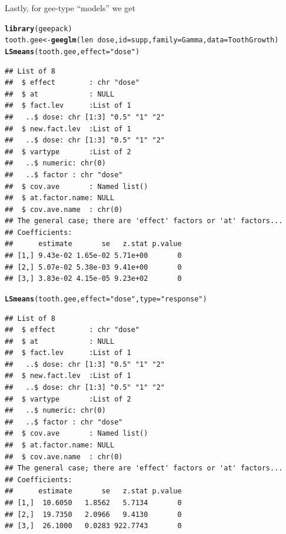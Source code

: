 \documentclass[10pt]{article}\usepackage[]{graphicx}\usepackage[]{color}
\makeatletter
\newcommand{\hlstr}[1]{\textcolor[rgb]{0.192,0.494,0.8}{#1}}%
\newcommand{\hlopt}[1]{\textcolor[rgb]{0,0,0}{#1}}%
\newcommand{\hlstd}[1]{\textcolor[rgb]{0.345,0.345,0.345}{#1}}%
\newcommand{\hlkwb}[1]{\textcolor[rgb]{0.69,0.353,0.396}{#1}}%
\newcommand{\hlkwc}[1]{\textcolor[rgb]{0.333,0.667,0.333}{#1}}%
\newcommand{\hlkwd}[1]{\textcolor[rgb]{0.737,0.353,0.396}{\textbf{#1}}}%
\newenvironment{kframe}{%
 \def\at@end@of@kframe{}%
 \ifinner\ifhmode%
  \def\at@end@of@kframe{\end{minipage}}%
  \begin{minipage}{\columnwidth}%
 \fi\fi%
 \def\FrameCommand##1{\hskip\@totalleftmargin \hskip-\fboxsep
 \colorbox{shadecolor}{##1}\hskip-\fboxsep
     \hskip-\linewidth \hskip-\@totalleftmargin \hskip\columnwidth}%
 \MakeFramed {\advance\hsize-\width
   \@totalleftmargin\z@ \linewidth\hsize
   \@setminipage}}%
 {\par\unskip\endMakeFramed%
 \at@end@of@kframe}
\newenvironment{knitrout}{}{} %
\makeatother
\begin{document}
Lastly, for gee-type ``models'' we get
\begin{knitrout}
\color{fgcolor}\begin{kframe}
\begin{alltt}
\hlkwd{library}\hlstd{(geepack)}
\hlstd{tooth.gee} \hlkwb{<-} \hlkwd{geeglm}\hlstd{(len} \hlopt{~} \hlstd{dose,} \hlkwc{id}\hlstd{=supp,} \hlkwc{family}\hlstd{=Gamma,} \hlkwc{data}\hlstd{=ToothGrowth)}
\hlkwd{LSmeans}\hlstd{(tooth.gee,} \hlkwc{effect}\hlstd{=}\hlstr{"dose"}\hlstd{)}
\end{alltt}
\begin{verbatim}
## List of 8
##  $ effect        : chr "dose"
##  $ at            : NULL
##  $ fact.lev      :List of 1
##   ..$ dose: chr [1:3] "0.5" "1" "2"
##  $ new.fact.lev  :List of 1
##   ..$ dose: chr [1:3] "0.5" "1" "2"
##  $ vartype       :List of 2
##   ..$ numeric: chr(0) 
##   ..$ factor : chr "dose"
##  $ cov.ave       : Named list()
##  $ at.factor.name: NULL
##  $ cov.ave.name  : chr(0) 
## The general case; there are 'effect' factors or 'at' factors...
## Coefficients:
##      estimate       se   z.stat p.value
## [1,] 9.43e-02 1.65e-02 5.71e+00       0
## [2,] 5.07e-02 5.38e-03 9.41e+00       0
## [3,] 3.83e-02 4.15e-05 9.23e+02       0
\end{verbatim}
\begin{alltt}
\hlkwd{LSmeans}\hlstd{(tooth.gee,} \hlkwc{effect}\hlstd{=}\hlstr{"dose"}\hlstd{,} \hlkwc{type}\hlstd{=}\hlstr{"response"}\hlstd{)}
\end{alltt}
\begin{verbatim}
## List of 8
##  $ effect        : chr "dose"
##  $ at            : NULL
##  $ fact.lev      :List of 1
##   ..$ dose: chr [1:3] "0.5" "1" "2"
##  $ new.fact.lev  :List of 1
##   ..$ dose: chr [1:3] "0.5" "1" "2"
##  $ vartype       :List of 2
##   ..$ numeric: chr(0) 
##   ..$ factor : chr "dose"
##  $ cov.ave       : Named list()
##  $ at.factor.name: NULL
##  $ cov.ave.name  : chr(0) 
## The general case; there are 'effect' factors or 'at' factors...
## Coefficients:
##      estimate       se   z.stat p.value
## [1,]  10.6050   1.8562   5.7134       0
## [2,]  19.7350   2.0966   9.4130       0
## [3,]  26.1000   0.0283 922.7743       0
\end{verbatim}
\end{kframe}
\end{knitrout}


\end{document}
